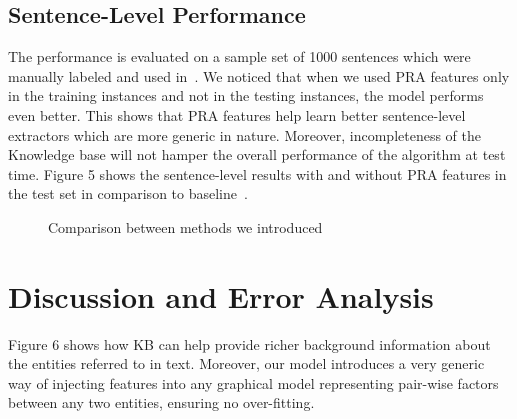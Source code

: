 \documentclass[11pt,a4paper]{article}
\begin{document}
\subsection{Sentence-Level Performance}

The performance is evaluated on a sample set of 1000 sentences which were
manually labeled and used in~\cite{hoffmann-2011-distant-supervision}. We
noticed that when we used PRA features only in the training instances and not
in the testing instances, the model performs even better. This shows that PRA
features help learn better sentence-level extractors which are more generic in
nature. Moreover, incompleteness of the Knowledge base will not hamper the
overall performance of the algorithm at test time. Figure 5 shows the
sentence-level results with and without PRA features in the test set in
comparison to baseline~\cite{hoffmann-2011-distant-supervision}.

\begin{figure}
  \centering
  \caption{Comparison between methods we introduced}
\end{figure}

\section{Discussion and Error Analysis}

Figure 6 shows how KB can help provide richer background information about the
entities referred to in text.  Moreover, our model introduces a very generic
way of injecting features into any graphical model representing pair-wise
factors between any two entities, ensuring no over-fitting.
\end{document}
